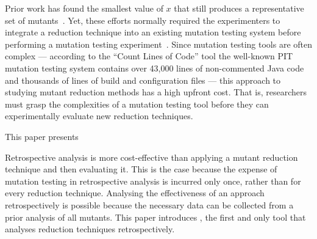 

Prior work has found the smallest value of $x$ that still produces a representative set of
mutants~\cite{jia2011analysis, mathur1994empirical}. Yet, these efforts normally required the experimenters to integrate
a reduction technique into an existing mutation testing system before performing a mutation testing
experiment~\cite{demillo1988extended, king1991fortran}. Since mutation testing tools are often complex --- according to
the ``Count Lines of Code'' tool the  well-known PIT mutation testing system contains over 43,000 lines of non-commented
Java code and thousands of lines of build and configuration files --- this approach to studying mutant reduction methods
has a high upfront cost. That is, researchers must grasp the complexities of a mutation testing tool before they can
experimentally evaluate new reduction techniques.


This paper presents

Retrospective analysis is more cost-effective than applying a mutant reduction technique and then evaluating it.  This
is the case because the expense of mutation testing in retrospective analysis is incurred only once, rather than for
every reduction technique. Analysing the effectiveness of an approach retrospectively is possible because the necessary
data can be collected from a prior analysis of all mutants.  This paper introduces \mr, the first and only tool that
analyses reduction techniques retrospectively.

